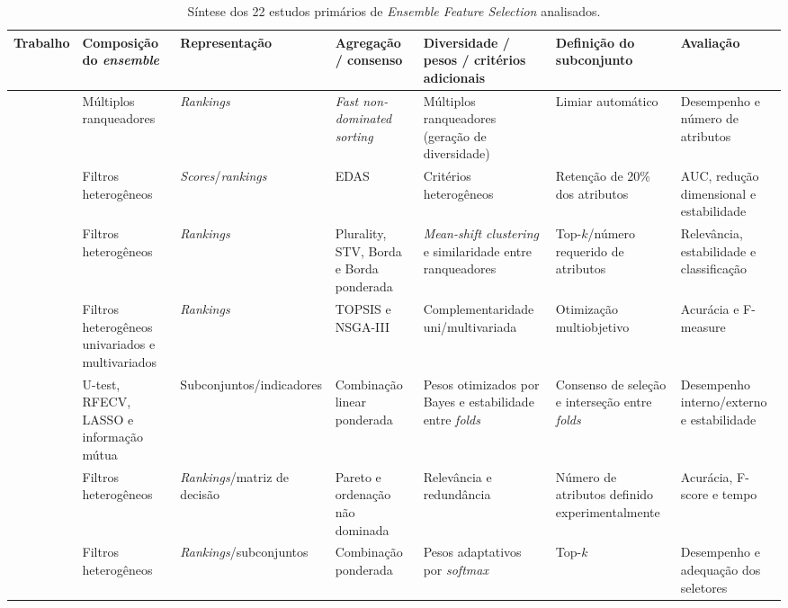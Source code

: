 \begin{table}
\centering
\caption{Síntese dos 22 estudos primários de \textit{Ensemble Feature Selection} analisados.}
\label{tab:efs}
\fontsize{8}{9.2}\selectfont
\setlength{\tabcolsep}{2.5pt}
\renewcommand{\arraystretch}{1.10}
\begin{tabular}{|P{2.3cm}|P{2.6cm}|P{2.3cm}|P{2.8cm}|P{3.0cm}|P{3.0cm}|P{2.6cm}|}
\hline
\textbf{Trabalho} &
\textbf{Composição do \textit{ensemble}} &
\textbf{Representação} &
\textbf{Agregação / consenso} &
\textbf{Diversidade / pesos / critérios adicionais} &
\textbf{Definição do subconjunto} &
\textbf{Avaliação} \\ \hline
\hline
{} & Múltiplos ranqueadores & \textit{Rankings} & \textit{Fast non-dominated sorting} & Múltiplos ranqueadores (geração de diversidade) & Limiar automático & Desempenho e número de atributos \\ \hline
{} & Filtros heterogêneos & \textit{Scores}\slash \textit{rankings} & EDAS & Critérios heterogêneos & Retenção de 20\% dos atributos & AUC, redução dimensional e estabilidade \\ \hline
{} & Filtros heterogêneos & \textit{Rankings} & Plurality, STV, Borda e Borda ponderada & \textit{Mean-shift clustering} e similaridade entre ranqueadores & Top-$k$/número requerido de atributos & Relevância, estabilidade e classificação \\ \hline
{} & Filtros heterogêneos univariados e multivariados & \textit{Rankings} & TOPSIS e NSGA-III & Complementaridade uni\slash multivariada & Otimização multiobjetivo & Acurácia e F-measure \\ \hline
{} & U-test, RFECV, LASSO e informação mútua & Subconjuntos\slash indicadores & Combinação linear ponderada & Pesos otimizados por Bayes e estabilidade entre \textit{folds} & Consenso de seleção e interseção entre \textit{folds} & Desempenho interno/externo e estabilidade \\ \hline
{} & Filtros heterogêneos & \textit{Rankings}\slash matriz de decisão & Pareto e ordenação não dominada & Relevância e redundância & Número de atributos definido experimentalmente & Acurácia, F-score e tempo \\ \hline
{} & Filtros heterogêneos & \textit{Rankings}\slash subconjuntos & Combinação ponderada & Pesos adaptativos por \textit{softmax} & Top-$k$ & Desempenho e adequação dos seletores \\ \hline

\end{tabular}
\end{table}
